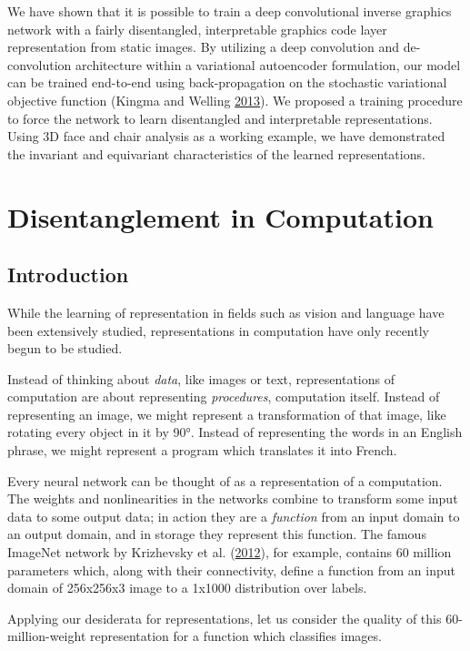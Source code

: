 \documentclass[12pt,twoside]{mitthesis}
\begin{document}
We have shown that it is possible to train a deep convolutional inverse
graphics network with a fairly disentangled, interpretable graphics code
layer representation from static images. By utilizing a deep convolution
and de-convolution architecture within a variational autoencoder
formulation, our model can be trained end-to-end using back-propagation
on the stochastic variational objective function (Kingma and Welling
\protect\hyperlink{ref-kingma2013auto}{2013}). We proposed a training
procedure to force the network to learn disentangled and interpretable
representations. Using 3D face and chair analysis as a working example,
we have demonstrated the invariant and equivariant characteristics of
the learned representations.

\chapter{Disentanglement in
Computation}\label{disentanglement-in-computation}

\section{Introduction}\label{introduction-2}

While the learning of representation in fields such as vision and
language have been extensively studied, representations in computation
have only recently begun to be studied.

Instead of thinking about \emph{data}, like images or text,
representations of computation are about representing \emph{procedures},
computation itself. Instead of representing an image, we might represent
a transformation of that image, like rotating every object in it by 90°.
Instead of representing the words in an English phrase, we might
represent a program which translates it into French.

Every neural network can be thought of as a representation of a
computation. The weights and nonlinearities in the networks combine to
transform some input data to some output data; in action they are a
\emph{function} from an input domain to an output domain, and in storage
they represent this function. The famous ImageNet network by Krizhevsky
et al. (\protect\hyperlink{ref-krizhevsky2012imagenet}{2012}), for
example, contains 60 million parameters which, along with their
connectivity, define a function from an input domain of 256x256x3 image
to a 1x1000 distribution over labels.

Applying our desiderata for representations, let us consider the quality
of this 60-million-weight representation for a function which classifies
images.
\end{document}
